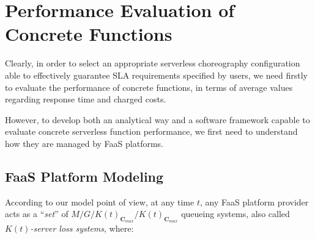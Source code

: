 \documentclass[12pt,a4paper]{report}
\begin{document}
\section{Performance Evaluation of Concrete Functions}

Clearly, in order to select an appropriate serverless choreography configuration able to effectively guarantee SLA requirements specified by users, we need firstly to evaluate the performance of concrete functions, in terms of average values regarding response time and charged costs.

However, to develop both an analytical way and a software framework capable to evaluate concrete serverless function performance, we first need to understand
how they are managed by FaaS platforms.

\subsection{FaaS Platform Modeling}

According to our model point of view, at any time $t$, any FaaS platform provider acts as a ``\textit{set}'' of $M/G/K(t)_{\textbf{C}_{max}}/K(t)_{\textbf{C}_{max}}$ queueing systems, also called \textit{$K(t)$-server loss systems}, where:
\end{document}
